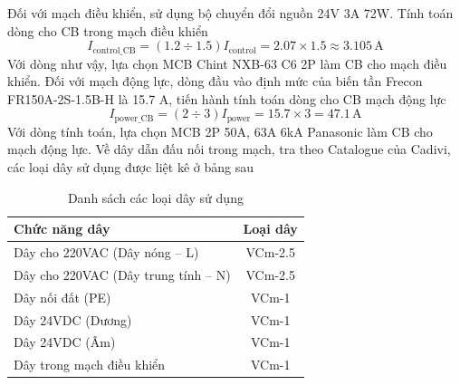           \hspace*{0.6cm}Đối với mạch điều khiển, sử dụng bộ chuyển đổi nguồn 24V 3A 72W.
          \newline
          \hspace*{0.6cm}Tính toán dòng cho CB trong mạch điều khiển
          \begin{equation}
               I_{\text{control\_CB}} = (1.2 \div 1.5)I_{\text{control}} = 2.07 \times 1.5 \approx 3.105 \,\mathrm{A}
               \label{c4_eq02}
          \end{equation}
          \hspace*{0.6cm}Với dòng như vậy, lựa chọn MCB Chint NXB-63 C6 2P làm CB cho mạch điều khiển.
          \newline
          \hspace*{0.6cm}Đối với mạch động lực, dòng đầu vào định mức của biến tần Frecon FR150A-2S-1.5B-H là 15.7 A, tiến hành tính toán dòng cho CB mạch động lực 
          \begin{equation}
               I_{\text{power\_CB}}  = (2 \div 3)I_{\text{power}} = 15.7 \times 3 = 47.1 \,\mathrm{A}
               \label{c4_eq03}
          \end{equation}
          \hspace*{0.6cm}Với dòng tính toán, lựa chọn MCB 2P 50A, 63A 6kA Panasonic làm CB cho mạch động lực.
          \newline
          \hspace*{0.6cm}Về dây dẫn đấu nối trong mạch, tra theo Catalogue của Cadivi, các loại dây sử dụng được liệt kê ở bảng sau
          \begin{table}[H]
               \caption{Danh sách các loại dây sử dụng}
               \label{tab:wire_list}
               \centering
               \begin{tabular}{|l|c|}
               \hline
               \textbf{Chức năng dây} & \textbf{Loại dây} \\ \hline

               Dây cho 220VAC (Dây nóng – L) & VCm-2.5 \\ \hline
               Dây cho 220VAC (Dây trung tính – N) & VCm-2.5 \\ \hline
               Dây nối đất (PE) & VCm-1 \\ \hline
               Dây 24VDC (Dương) & VCm-1 \\ \hline
               Dây 24VDC (Âm) & VCm-1 \\ \hline
               Dây trong mạch điều khiển & VCm-1 \\ \hline
               \end{tabular}
          \end{table}



